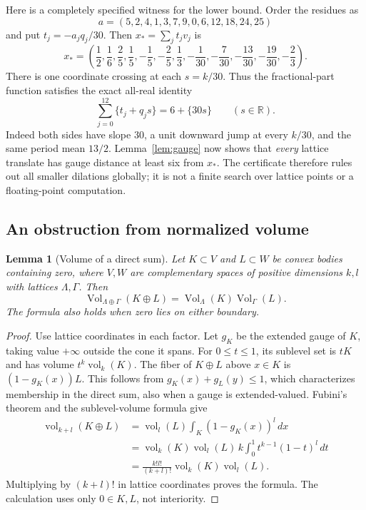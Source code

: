 \documentclass[11pt,a4paper]{article}
\newtheorem{lemma}[theorem]{Lemma}
\theoremstyle{definition}\newtheorem{definition}[theorem]{Definition}
\theoremstyle{remark}\newtheorem{remark}[theorem]{Remark}
\DeclareMathOperator{\Vol}{Vol}
\DeclareMathOperator{\vol}{vol}
\newcommand{\R}{\mathbb R}\newcommand{\Z}{\mathbb Z}
\begin{document}
Here is a completely specified witness for the lower bound. Order
the residues as
\[
 a=(5,2,4,1,3,7,9,0,6,12,18,24,25)
\]
and put $t_j=-a_jq_j/30$. Then $x_*=\sum_jt_jv_j$ is
\begin{equation}\label{eq:deephole}
 x_* =\left(\frac12,\frac16,\frac25,\frac15,-\frac15,-\frac25,
 \frac13,-\frac1{30},-\frac7{30},-\frac{13}{30},
 -\frac{19}{30},-\frac23\right).
\end{equation}
There is one coordinate crossing at each $s=k/30$. Thus the
fractional-part function satisfies the exact all-real identity
\begin{equation}\label{eq:certifiedflow}
 \sum_{j=0}^{12}\{t_j+q_js\}=6+\{30s\}\qquad(s\in\R).
\end{equation}
Indeed both sides have slope $30$, a unit downward jump at every
$k/30$, and the same period mean $13/2$. Lemma~\ref{lem:gauge}
now shows that \emph{every} lattice translate has gauge distance
at least six from $x_*$. The certificate therefore rules out all
smaller dilations globally; it is not a finite search over lattice
points or a floating-point computation.

\subsection{An obstruction from normalized volume}
\begin{lemma}[Volume of a direct sum]\label{lem:sumvolume}
Let $K\subset V$ and $L\subset W$ be convex bodies containing zero,
where $V,W$ are complementary spaces of positive dimensions $k,l$
with lattices $\Lambda,\Gamma$. Then
\[
 \Vol_{\Lambda\oplus\Gamma}(K\oplus L)
 =\Vol_\Lambda(K)\Vol_\Gamma(L).
\]
The formula also holds when zero lies on either boundary.
\end{lemma}
\begin{proof}
Use lattice coordinates in each factor. Let $g_K$ be the extended
gauge of $K$, taking value $+\infty$ outside the cone it spans.
For $0\le t\le1$, its sublevel set is $tK$ and has volume
$t^k\vol_k(K)$. The fiber of $K\oplus L$ above $x\in K$ is
$(1-g_K(x))L$. This follows from
$g_K(x)+g_L(y)\le1$, which characterizes membership in the direct
sum, also when a gauge is extended-valued. Fubini's theorem and
the sublevel-volume formula give
\begin{align*}
 \vol_{k+l}(K\oplus L)
 &=\vol_l(L)\int_K(1-g_K(x))^l\,dx\\
 &=\vol_k(K)\vol_l(L)\,k\int_0^1t^{k-1}(1-t)^l\,dt\\
 &=\frac{k!l!}{(k+l)!}\vol_k(K)\vol_l(L).
\end{align*}
Multiplying by $(k+l)!$ in lattice coordinates proves the formula.
The calculation uses only $0\in K,L$, not interiority.
\end{proof}
\end{document}
